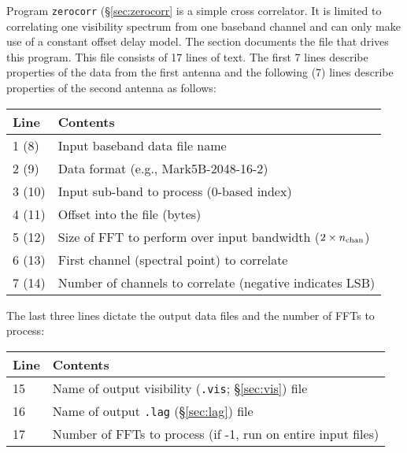 Program {\tt zerocorr} (\S\ref{sec:zerocorr} is a simple cross correlator.
It is limited to correlating one visibility spectrum from one baseband channel and can only make use of a constant offset delay model.
The section documents the file that drives this program.
This file consists of 17 lines of text.
The first 7 lines describe properties of the data from the first antenna and the following (7) lines describe properties of the second antenna as follows:
\begin{center}
\begin{tabular}{ll}
\hline
Line & Contents \\
\hline
1 (8) & Input baseband data file name \\
2 (9) & Data format (e.g., Mark5B-2048-16-2) \\
3 (10) & Input sub-band to process (0-based index) \\
4 (11) & Offset into the file (bytes) \\
5 (12) & Size of FFT to perform over input bandwidth ($2\times n_{\rm chan}$) \\
6 (13) & First channel (spectral point) to correlate \\
7 (14) & Number of channels to correlate (negative indicates LSB) \\
\hline
\end{tabular}
\end{center}

The last three lines dictate the output data files and the number of FFTs to process:

\begin{center}
\begin{tabular}{ll}
\hline
Line & Contents \\
\hline
15 & Name of output visibility ({\tt .vis}; \S\ref{sec:vis}) file \\
16 & Name of output {\tt .lag} (\S\ref{sec:lag}) file \\
17 & Number of FFTs to process (if -1, run on entire input files) \\
\hline
\end{tabular}
\end{center}

